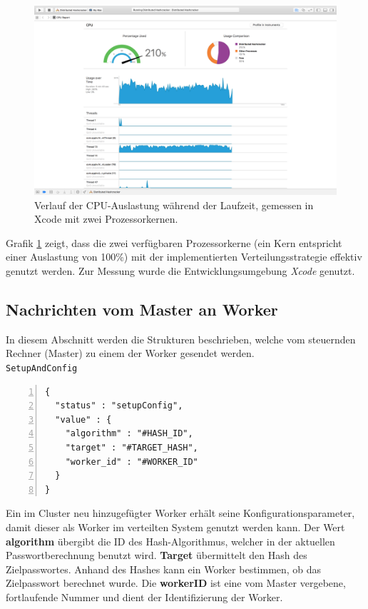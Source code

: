 \begin{figure}[!ht]
	\centering
		\includegraphics[natwidth=1200pt, natheight=349pt, width=1.0\textwidth]{images/screenshot_cpu.png}
	\caption{Verlauf der CPU-Auslastung während der Laufzeit, gemessen in Xcode mit zwei Prozessorkernen.}
	\label{fig:screenshotCPU}
\end{figure}


Grafik \ref{fig:screenshotCPU} zeigt, dass die zwei verfügbaren Prozessorkerne (ein Kern entspricht einer Auslastung von 100\%) mit der implementierten Verteilungsstrategie effektiv genutzt werden. Zur Messung wurde die Entwicklungsumgebung \emph{Xcode} genutzt. 

\subsection{Nachrichten vom Master an Worker}
In diesem Abschnitt werden die Strukturen beschrieben, welche vom steuernden Rechner (Master) zu einem der Worker gesendet werden.\\

\texttt{SetupAndConfig}
\begin{lstlisting}[basicstyle=\ttfamily,numbers=left,numberstyle=\footnotesize\ttfamily,backgroundcolor=\color{sourcegray}]
{
  "status" : "setupConfig",
  "value" : {
    "algorithm" : "#HASH_ID",
    "target" : "#TARGET_HASH", 
    "worker_id" : "#WORKER_ID"
  }
}
\end{lstlisting}
Ein im Cluster neu hinzugefügter Worker erhält seine Konfigurationsparameter, damit dieser als Worker im verteilten System genutzt werden kann. 
Der Wert \textbf{algorithm} übergibt die ID des Hash-Algorithmus, welcher in der aktuellen Passwortberechnung benutzt wird. \textbf{Target} übermittelt den Hash des Zielpasswortes. Anhand des Hashes kann ein Worker bestimmen, ob das Zielpasswort berechnet wurde. Die \textbf{workerID} ist eine vom Master vergebene, fortlaufende Nummer und dient der Identifizierung der Worker.\\


